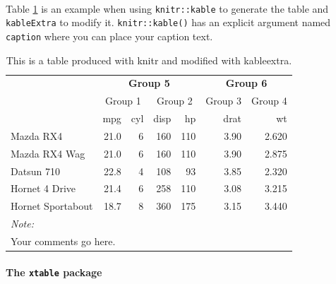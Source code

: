 \documentclass[a4paper,12pt]{article}
\begin{document}
~

Table \ref{tab:kable1} is an example when using \texttt{knitr::kable} to generate the table and \texttt{kableExtra} to modify it. \texttt{knitr::kable()} has an explicit argument named \texttt{caption} where you can place your caption text.
\begin{table}

\caption{\label{tab:kable1}This is a table produced with knitr and modified with kableextra.}
\centering
\fontsize{9}{11}\selectfont
\begin{tabular}[t]{lrrrrrr}
\toprule
\multicolumn{1}{c}{\textbf{ }} & \multicolumn{4}{c}{\textbf{Group 5}} & \multicolumn{2}{c}{\textbf{Group 6}} \\
\cmidrule(l{3pt}r{3pt}){2-5} \cmidrule(l{3pt}r{3pt}){6-7}
\multicolumn{1}{c}{ } & \multicolumn{2}{c}{Group 1} & \multicolumn{2}{c}{Group 2} & \multicolumn{1}{c}{Group 3} & \multicolumn{1}{c}{Group 4} \\
\cmidrule(l{3pt}r{3pt}){2-3} \cmidrule(l{3pt}r{3pt}){4-5} \cmidrule(l{3pt}r{3pt}){6-6} \cmidrule(l{3pt}r{3pt}){7-7}
  & mpg & cyl & disp & hp & drat & wt\\
\midrule
Mazda RX4 & 21.0 & 6 & 160 & 110 & 3.90 & 2.620\\
Mazda RX4 Wag & 21.0 & 6 & 160 & 110 & 3.90 & 2.875\\
Datsun 710 & 22.8 & 4 & 108 & 93 & 3.85 & 2.320\\
Hornet 4 Drive & 21.4 & 6 & 258 & 110 & 3.08 & 3.215\\
Hornet Sportabout & 18.7 & 8 & 360 & 175 & 3.15 & 3.440\\
\bottomrule
\multicolumn{7}{l}{\textit{Note: }}\\
\multicolumn{7}{l}{Your comments go here.}\\
\end{tabular}
\end{table}
\hypertarget{the-xtable-package}{%
\paragraph{\texorpdfstring{The \texttt{xtable} package}{The xtable package}}\label{the-xtable-package}}

~
\end{document}

